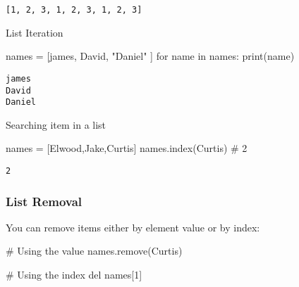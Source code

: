 \documentclass[
  letterpaper,
  DIV=11,
  numbers=noendperiod]{scrreprt}
\newenvironment{Shaded}{\begin{snugshade}}{\end{snugshade}}
\newcommand{\BuiltInTok}[1]{\textcolor[rgb]{0.00,0.46,0.62}{#1}}
\newcommand{\BuiltInTok}[1]{\textcolor[rgb]{0.00,0.48,0.65}{#1}}
\newcommand{\CommentTok}[1]{\textcolor[rgb]{0.37,0.37,0.37}{#1}}
\newcommand{\ControlFlowTok}[1]{\textcolor[rgb]{0.00,0.46,0.62}{#1}}
\newcommand{\ControlFlowTok}[1]{\textcolor[rgb]{0.00,0.48,0.65}{#1}}
\newcommand{\DecValTok}[1]{\textcolor[rgb]{0.68,0.00,0.00}{#1}}
\newcommand{\KeywordTok}[1]{\textcolor[rgb]{0.00,0.46,0.62}{#1}}
\newcommand{\NormalTok}[1]{\textcolor[rgb]{0.00,0.46,0.62}{#1}}
\newcommand{\OperatorTok}[1]{\textcolor[rgb]{0.37,0.37,0.37}{#1}}
\newcommand{\KeywordTok}[1]{\textcolor[rgb]{0.00,0.48,0.65}{#1}}
\newcommand{\NormalTok}[1]{\textcolor[rgb]{0.00,0.48,0.65}{#1}}
\newcommand{\OperatorTok}[1]{\textcolor[rgb]{0.37,0.37,0.37}{#1}}
\newcommand{\StringTok}[1]{\textcolor[rgb]{0.13,0.47,0.30}{#1}}
\begin{document}
\begin{Shaded}
\begin{Highlighting}[]
\begin{verbatim}
[1, 2, 3, 1, 2, 3, 1, 2, 3]
\end{verbatim}

List Iteration

\begin{Shaded}
\begin{Highlighting}[]
\NormalTok{names }\OperatorTok{=}\NormalTok{ [}\StringTok{\textquotesingle{}james\textquotesingle{}}\NormalTok{, }\StringTok{\textquotesingle{}David\textquotesingle{}}\NormalTok{, }\StringTok{"Daniel"}\NormalTok{ ]}
\ControlFlowTok{for}\NormalTok{ name }\KeywordTok{in}\NormalTok{ names:}
    \BuiltInTok{print}\NormalTok{(name)}
\end{Highlighting}
\end{Shaded}

\begin{verbatim}
james
David
Daniel
\end{verbatim}

Searching item in a list

\begin{Shaded}
\begin{Highlighting}[]
\NormalTok{names }\OperatorTok{=}\NormalTok{ [}\StringTok{\textquotesingle{}Elwood\textquotesingle{}}\NormalTok{,}\StringTok{\textquotesingle{}Jake\textquotesingle{}}\NormalTok{,}\StringTok{\textquotesingle{}Curtis\textquotesingle{}}\NormalTok{]}
\NormalTok{names.index(}\StringTok{\textquotesingle{}Curtis\textquotesingle{}}\NormalTok{)   }\CommentTok{\# 2}
\end{Highlighting}
\end{Shaded}

\begin{verbatim}
2
\end{verbatim}

\hypertarget{list-removal}{%
\subsubsection{List Removal}\label{list-removal}}

You can remove items either by element value or by index:

\begin{Shaded}
\begin{Highlighting}[]
\CommentTok{\# Using the value}
\NormalTok{names.remove(}\StringTok{\textquotesingle{}Curtis\textquotesingle{}}\NormalTok{)}

\CommentTok{\# Using the index}
\KeywordTok{del}\NormalTok{ names[}\DecValTok{1}\NormalTok{]}


\end{Highlighting}
\end{Shaded}
\end{Highlighting}
\end{Shaded}
\end{document}
